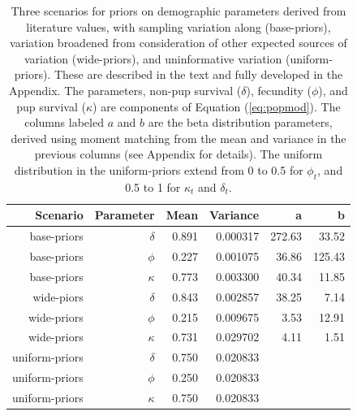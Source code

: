 \documentclass[12pt, titlepage]{article}\usepackage[]{graphicx}\usepackage[]{color}
\begin{document}
\begin{table}[ht] 
\caption{Three scenarios for priors on demographic parameters derived from literature values, with sampling variation along (base-priors), variation broadened from consideration of other expected sources of variation (wide-priors), and uninformative variation (uniform-priors). These are described in the text and fully developed in the Appendix. The parameters, non-pup survival ($\delta$), fecundity ($\phi$), and pup survival ($\kappa$) are components of Equation (\ref{eq:popmod}). The columns labeled $a$ and $b$ are the beta distribution parameters, derived using moment matching from the mean and variance in the previous columns (see Appendix for details). The uniform distribution in the uniform-priors extend from 0 to 0.5 for $\phi_t$, and 0.5 to 1 for $\kappa_t$ and $\delta_t$. \label{tab:scenarios}}
\centering
\begin{tabular}{rrrrrr}
  \hline
  \hline
  Scenario & Parameter & Mean & Variance & a & b \\ 
  \hline
  \hline
  base-priors & $\delta$ & 0.891 & 0.000317 & 
    272.63 & 33.52 \\ 
  base-priors & $\phi$ & 0.227 & 0.001075 & 
    36.86 & 125.43 \\ 
  base-priors & $\kappa$ & 0.773 & 0.003300 & 
    40.34 & 11.85 \\ 
  \hline
  wide-piors & $\delta$ & 0.843 & 0.002857 &
    38.25 & 7.14 \\ 
  wide-priors & $\phi$ & 0.215 & 0.009675 &
    3.53 & 12.91 \\ 
  wide-priors & $\kappa$ & 0.731 & 0.029702 &
    4.11 & 1.51 \\ 
  \hline
  uniform-priors & $\delta$ & 0.750 & 0.020833 & { } & { } \\ 
  uniform-priors & $\phi$ & 0.250 & 0.020833 & { } & { } \\ 
  uniform-priors & $\kappa$ & 0.750 & 0.020833 & { } & { } \\
  \hline
\end{tabular}
\end{table}


\end{document}
